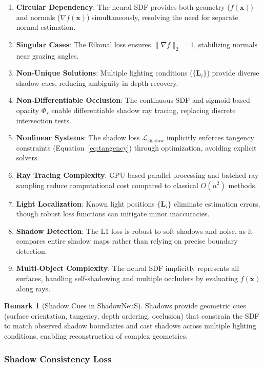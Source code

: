 \documentclass[12pt]{article}
\theoremstyle{definition}
\newtheorem{remark}{Remark}[subsection]
\begin{document}
\begin{enumerate}[label=\arabic*.]
    \item \textbf{Circular Dependency}: The neural SDF provides both geometry (\(f(\mathbf{x})\)) and normals (\(\nabla f(\mathbf{x})\)) simultaneously, resolving the need for separate normal estimation.
    \item \textbf{Singular Cases}: The Eikonal loss ensures \(\|\nabla f\|_2 = 1\), stabilizing normals near grazing angles.
    \item \textbf{Non-Unique Solutions}: Multiple lighting conditions (\(\{\mathbf{L}_i\}\)) provide diverse shadow cues, reducing ambiguity in depth recovery.
    \item \textbf{Non-Differentiable Occlusion}: The continuous SDF and sigmoid-based opacity \(\Phi_s\) enable differentiable shadow ray tracing, replacing discrete intersection tests.
    \item \textbf{Nonlinear Systems}: The shadow loss \(\mathcal{L}_{\text{shadow}}\) implicitly enforces tangency constraints (Equation~\eqref{eq:tangency}) through optimization, avoiding explicit solvers.
    \item \textbf{Ray Tracing Complexity}: GPU-based parallel processing and batched ray sampling reduce computational cost compared to classical \(O(n^2)\) methods.
    \item \textbf{Light Localization}: Known light positions \(\{\mathbf{L}_i\}\) eliminate estimation errors, though robust loss functions can mitigate minor inaccuracies.
    \item \textbf{Shadow Detection}: The L1 loss is robust to soft shadows and noise, as it compares entire shadow maps rather than relying on precise boundary detection.
    \item \textbf{Multi-Object Complexity}: The neural SDF implicitly represents all surfaces, handling self-shadowing and multiple occluders by evaluating \(f(\mathbf{x})\) along rays.
\end{enumerate}

\begin{remark}[Shadow Cues in ShadowNeuS]
Shadows provide geometric cues (surface orientation, tangency, depth ordering, occlusion) that constrain the SDF to match observed shadow boundaries and cast shadows across multiple lighting conditions, enabling reconstruction of complex geometries.
\end{remark}

\subsubsection{Shadow Consistency Loss} \label{sec:shadowneus_loss}
\end{document}

